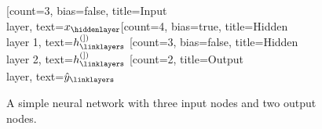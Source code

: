 \newcommand{\neuralx}[2]{\(x_#2\)}
\newcommand{\neuraly}[2]{\(\hat{y}_#2\)}
\newcommand{\neuralh}[2]{\small \(h^{(#1)}_#2\)}
\begin{figure}[ht]
  \centering
  \caption[An example of a neural network]{A simple neural network with three input nodes and two output nodes.} %
  \begin{neuralnetwork}[height=5]
    [count=3, bias=false, title=Input\\layer, text=\neuralx]
    \hiddenlayer[count=4, bias=true, title=Hidden\\layer 1, text=\neuralh] \linklayers{}
    \hiddenlayer[count=3, bias=false, title=Hidden\\layer 2, text=\neuralh] \linklayers{}
    \outputlayer[count=2, title=Output\\layer, text=\neuraly] \linklayers{}
  \end{neuralnetwork}\label{fig:neural_network}
\end{figure}